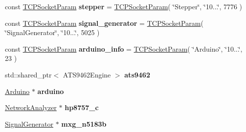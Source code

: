 \begin{DoxyCompactItemize}
\item 
const \hyperlink{struct_t_c_p_socket_param}{T\+C\+P\+Socket\+Param} {\bfseries stepper} = \hyperlink{struct_t_c_p_socket_param}{T\+C\+P\+Socket\+Param}( \char`\"{}Stepper\char`\"{}, \char`\"{}10...\char`\"{}, 7776 )\hypertarget{classetig_1_1_program_core_a4b8a04ab5747b0f9a247dadd7118b654}{}\label{classetig_1_1_program_core_a4b8a04ab5747b0f9a247dadd7118b654}

\item 
const \hyperlink{struct_t_c_p_socket_param}{T\+C\+P\+Socket\+Param} {\bfseries signal\+\_\+generator} = \hyperlink{struct_t_c_p_socket_param}{T\+C\+P\+Socket\+Param}( \char`\"{}Signal\+Generator\char`\"{}, \char`\"{}10...\char`\"{}, 5025 )\hypertarget{classetig_1_1_program_core_a9ae804b8a25e4ad6fdc3a2fc023667a0}{}\label{classetig_1_1_program_core_a9ae804b8a25e4ad6fdc3a2fc023667a0}

\item 
const \hyperlink{struct_t_c_p_socket_param}{T\+C\+P\+Socket\+Param} {\bfseries arduino\+\_\+info} = \hyperlink{struct_t_c_p_socket_param}{T\+C\+P\+Socket\+Param}( \char`\"{}Arduino\char`\"{}, \char`\"{}10...\char`\"{}, 23 )\hypertarget{classetig_1_1_program_core_a071fd67790cc4f2ea909f33ebe19710c}{}\label{classetig_1_1_program_core_a071fd67790cc4f2ea909f33ebe19710c}

\item 
std\+::shared\+\_\+ptr$<$ A\+T\+S9462\+Engine $>$ {\bfseries ats9462}\hypertarget{classetig_1_1_program_core_a4ec687ca2ad049330abe582dc98e0155}{}\label{classetig_1_1_program_core_a4ec687ca2ad049330abe582dc98e0155}

\item 
\hyperlink{class_arduino}{Arduino} $\ast$ {\bfseries arduino}\hypertarget{classetig_1_1_program_core_af68538ad2f740c504af9f02c74f2e899}{}\label{classetig_1_1_program_core_af68538ad2f740c504af9f02c74f2e899}

\item 
\hyperlink{class_network_analyzer}{Network\+Analyzer} $\ast$ {\bfseries hp8757\+\_\+c}\hypertarget{classetig_1_1_program_core_a97b51dfcdeb19a3e1f7795366f208fb8}{}\label{classetig_1_1_program_core_a97b51dfcdeb19a3e1f7795366f208fb8}

\item 
\hyperlink{class_signal_generator}{Signal\+Generator} $\ast$ {\bfseries mxg\+\_\+n5183b}\hypertarget{classetig_1_1_program_core_aa2c7133f1c63bcbbffe4e7624b643752}{}\label{classetig_1_1_program_core_aa2c7133f1c63bcbbffe4e7624b643752}


\end{DoxyCompactItemize}

